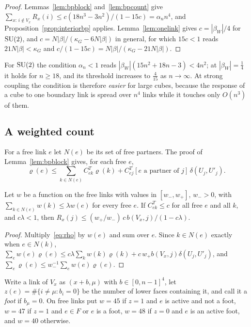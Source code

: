 \begin{proof}
Lemmas~\ref{lem:bpblock} and~\ref{lem:bpcount} give $\sum_{x:\,i\notin V_x}
R_x(i)\le c(18n^3-3n^2)/(1-15c)=\alpha_nn^4$, and
Proposition~\ref{prop:interiorbp} applies. Lemma~\ref{lem:onelink} gives
$c=|\beta_W|/4$ for $\mathrm{SU}(2)$, and $c=N|\beta|/(\kappa_G-6N|\beta|)$ in
general, for which $15c<1$ reads $21N|\beta|<\kappa_G$ and $c/(1-15c)=
N|\beta|/(\kappa_G-21N|\beta|)$.
\end{proof}

For $\mathrm{SU}(2)$ the condition $\alpha_n<1$ reads $|\beta_W|(15n^2+18n-3)<4n^2$; at
$|\beta_W|=\frac14$ it holds for $n\ge18$, and its threshold increases to
$\frac4{15}$ as $n\to\infty$. At strong coupling the condition is therefore
\emph{easier} for large cubes, because the response of a cube to one boundary
link is spread over $n^4$ links while it touches only $O(n^3)$ of them.

\subsection*{A weighted count}
For a free link $e$ let $N(e)$ be its set of free partners. The proof of
Lemma~\ref{lem:bpblock} gives, for each free $e$,
\begin{equation}\label{eq:rho}
\varrho(e)\le\sum_{k\in N(e)}C^T_{ek}\varrho(k)+C^T_{ej}[e\text{ a partner of }j]
\,\delta(U_j,U'_j).
\end{equation}

\begin{lemma}\label{lem:weightedresp}
Let $w$ be a function on the free links with values in $[w_-,w_+]$, $w_->0$,
with $\sum_{k\in N(e)}w(k)\le\lambda w(e)$ for every free $e$. If $C^T_{ek}\le
c$ for all free $e$ and all $k$, and $c\lambda<1$, then
$R_x(j)\le(w_+/w_-)\,c\,b(V_x,j)/(1-c\lambda)$.
\end{lemma}

\begin{proof}
Multiply~\eqref{eq:rho} by $w(e)$ and sum over $e$. Since $k\in N(e)$ exactly
when $e\in N(k)$, $\sum_ew(e)\varrho(e)\le c\lambda\sum_kw(k)\varrho(k)+
c\,w_+b(V_x,j)\delta(U_j,U'_j)$, and $\sum_e\varrho(e)\le w_-^{-1}\sum_ew(e)
\varrho(e)$.
\end{proof}

Write a link of $V_x$ as $(x+b,\mu)$ with $b\in[0,n-1]^4$, let
$z(e)=\#\{i\ne\mu:b_i=0\}$ be the number of lower faces containing it, and
call it a \emph{foot} if $b_\mu=0$. On free links put $w=45$ if $z=1$ and $e$
is active and not a foot, $w=47$ if $z=1$ and $e\in F$ or $e$ is a foot,
$w=48$ if $z=0$ and $e$ is an active foot, and $w=40$ otherwise.

